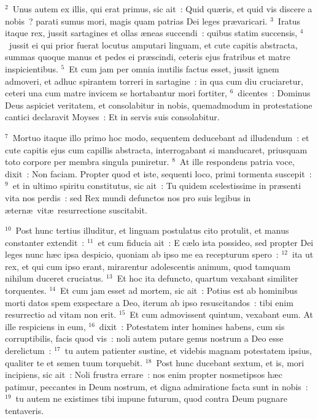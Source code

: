 ${}^{2}$~Unus autem ex illis, qui erat primus, sic ait~: Quid qu\ae ris, et quid vis discere a nobis~? parati sumus mori, magis quam patrias Dei leges pr\ae varicari.
${}^{3}$~Iratus itaque rex, jussit sartagines et ollas \ae neas succendi~: quibus statim succensis,
${}^{4}$~jussit ei qui prior fuerat locutus amputari linguam, et cute capitis abstracta, summas quoque manus et pedes ei pr\ae scindi, ceteris ejus fratribus et matre inspicientibus.
${}^{5}$~Et cum jam per omnia inutilis factus esset, jussit ignem admoveri, et adhuc spirantem torreri in sartagine~: in qua cum diu cruciaretur, ceteri una cum matre invicem se hortabantur mori fortiter,
${}^{6}$~dicentes~: Dominus Deus aspiciet veritatem, et consolabitur in nobis, quemadmodum in protestatione cantici declaravit Moyses~: Et in servis suis consolabitur.


${}^{7}$~Mortuo itaque illo primo hoc modo, sequentem deducebant ad illudendum~: et cute capitis ejus cum capillis abstracta, interrogabant si manducaret, priusquam toto corpore per membra singula puniretur.
${}^{8}$~At ille respondens patria voce, dixit~: Non faciam. Propter quod et iste, sequenti loco, primi tormenta suscepit~:
${}^{9}$~et in ultimo spiritu constitutus, sic ait~: Tu quidem scelestissime in pr\ae senti vita nos perdis~: sed Rex mundi defunctos nos pro suis legibus in \ae tern\ae\ vit\ae\ resurrectione suscitabit.


${}^{10}$~Post hunc tertius illuditur, et linguam postulatus cito protulit, et manus constanter extendit~:
${}^{11}$~et cum fiducia ait~: E c\ae lo ista possideo, sed propter Dei leges nunc h\ae c ipsa despicio, quoniam ab ipso me ea recepturum spero~:
${}^{12}$~ita ut rex, et qui cum ipso erant, mirarentur adolescentis animum, quod tamquam nihilum duceret cruciatus.
${}^{13}$~Et hoc ita defuncto, quartum vexabant similiter torquentes.
${}^{14}$~Et cum jam esset ad mortem, sic ait~: Potius est ab hominibus morti datos spem exspectare a Deo, iterum ab ipso resuscitandos~: tibi enim resurrectio ad vitam non erit.
${}^{15}$~Et cum admovissent quintum, vexabant eum. At ille respiciens in eum,
${}^{16}$~dixit~: Potestatem inter homines habens, cum sis corruptibilis, facis quod vis~: noli autem putare genus nostrum a Deo esse derelictum~:
${}^{17}$~tu autem patienter sustine, et videbis magnam potestatem ipsius, qualiter te et semen tuum torquebit.
${}^{18}$~Post hunc ducebant sextum, et is, mori incipiens, sic ait~: Noli frustra errare~: nos enim propter nosmetipsos h\ae c patimur, peccantes in Deum nostrum, et digna admiratione facta sunt in nobis~:
${}^{19}$~tu autem ne existimes tibi impune futurum, quod contra Deum pugnare tentaveris.


